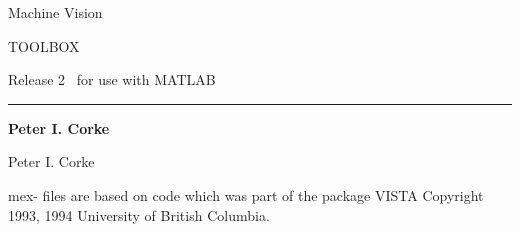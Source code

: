 \documentclass{article}
\begin{document}
\thispagestyle{empty}
\vspace*{\fill}
{\Headingi Machine Vision}

\vspace{2mm}
{\Heading TOOLBOX\\}

\vspace*{2cm}
{\Afon Release 2\ }
\vspace*{2cm}
{\Afon for use with MATLAB}
\vspace{4cm}
\hrule
{\Large
\parbox{80mm}{\textbf{Peter I. Corke} \\
}
\newpage
\vspace*{\fill}
\setlength{\fboxsep}{10pt}%
\begin{Bflushleft}[b]
\School Peter I. Corke
\end{Bflushleft}
\vspace*{\fill}

\noindent
mex- files are based on code which was part of the package VISTA Copyright 1993, 1994 University of British Columbia.
\cleardoublepage

}
\end{document}
